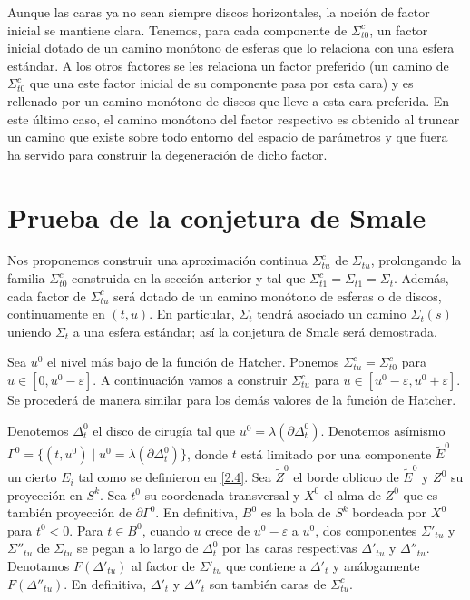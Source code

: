 \documentclass[twoside, 11pt]{article}
\begin{document}
Aunque las caras ya no sean siempre discos horizontales, la noción de factor inicial se mantiene clara. Tenemos, para cada componente de $\Sigma_{t0}^c$, un factor inicial dotado de un camino monótono de esferas que lo relaciona con una esfera estándar. A los otros factores se les relaciona un factor preferido (un camino de $\Sigma_{t0}^c$ que una este factor inicial de su componente pasa por esta cara) y es rellenado por un camino monótono de discos que lleve a esta cara preferida. En este último caso, el camino monótono del factor respectivo es obtenido al truncar un camino que existe sobre todo entorno del espacio de parámetros y que fuera ha servido para construir la degeneración de dicho factor.  



\section{Prueba de la conjetura de Smale}

Nos proponemos construir una aproximación continua $\Sigma_{tu}^c$ de $\Sigma_{tu}$, prolongando la familia $\Sigma_{t0}^c$ construida en la sección anterior y tal que $\Sigma_{t1}^c=\Sigma_{t1}=\Sigma_t$. Además, cada factor de $\Sigma_{tu}^c$ será dotado de un camino monótono de esferas o de discos, continuamente en $(t,u)$. En particular, $\Sigma_t$ tendrá asociado un camino $\Sigma_t(s)$ uniendo $\Sigma_t$ a una esfera estándar; así la conjetura de Smale será demostrada. 


Sea $u^0$ el nivel más bajo de la función de Hatcher. Ponemos $\Sigma_{tu}^c=\Sigma_{t0}^c$ para $u\in [0,u^0-\varepsilon]$. A continuación vamos a construir $\Sigma_{tu}^c$ para $u\in [u^0-\varepsilon, u^0+\varepsilon]$. Se procederá de manera similar para los demás valores de la función de Hatcher.

Denotemos $\Delta_t^0$ el disco de cirugía tal que $u^0=\lambda(\partial \Delta^0_t)$. Denotemos asímismo $\Gamma^0=\{(t,u^0) \mid u^0=\lambda(\partial \Delta^0_t)\}$, donde $t$ está limitado por una componente $\widetilde{E}^0$ un cierto $E_i$ tal como se definieron en \ref{2.4}. Sea $\widetilde{Z}^0$ el borde oblicuo de $\widetilde{E}^0$ y $Z^0$ su proyección en $S^k$. Sea $t^0$ su coordenada transversal y $X^0$ el alma de $Z^0$ que es también proyección de $\partial\Gamma^0$. En definitiva, $B^0$ es la bola de $S^k$ bordeada por $X^0$ para $t^0<0$. Para $t\in B^0$, cuando $u$ crece de $u^0-\varepsilon$ a $u^0$, dos componentes $\Sigma'_{tu}$ y $\Sigma''_{tu}$ de $\Sigma_{tu}$ se pegan a lo largo de $\Delta^0_t$ por las caras respectivas $\Delta'_{tu}$ y $\Delta''_{tu}$. Denotamos $F(\Delta'_{tu})$ al factor de $\Sigma'_{tu}$ que contiene a $\Delta'_t$ y análogamente $F(\Delta''_{tu})$. En definitiva, $\Delta'_t$ y $\Delta''_t$ son también caras de $\Sigma_{tu}^c$. 
\end{document}
